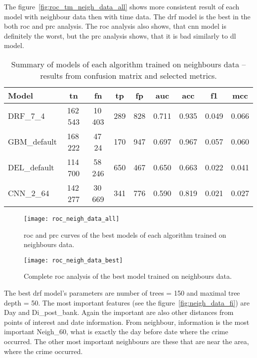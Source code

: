 \documentclass[thesis=M,english]{FITthesis}[2012/10/20]
\begin{document}
The figure~\ref{fig:roc_tm_neigh_data_all} shows more consistent result of each model with neighbour data then with time data. The \gls{drf} model is the best in the both \gls{roc} and \gls{prc} analysis. The \gls{roc} analysis also shows, that \gls{cnn} model is definitely the worst, but the \gls{prc} analysis shows, that it is bad similarly to \gls{dl} model. 

\begin{table}[H]\centering
\begin{small}
    \caption{Summary of models of each algorithm trained on neighbours data -- results from confusion matrix and selected metrics.}\label{tab:neigh_data_summary}
    \begin{tabular}{|l|c|c|c|c|c|c|c|c|}\hline
        Model & \gls{tn} & \gls{fn} & \gls{tp} & \gls{fp} & \gls{auc} & \gls{acc} & \gls{f1} & \gls{mcc} \tabularnewline \hline \hline
        DRF\_7\_4 & 162\,543 & 10\,403 & 289 & 828 & 0.711 & 0.935 & 0.049 & 0.066 \tabularnewline \hline
        GBM\_default & 168\,222 & 47\,24 & 170 & 947 & 0.697 & 0.967 & 0.057 & 0.060 \tabularnewline \hline
        DEL\_default & 114\,700 & 58\,246 & 650 & 467 & 0.650 & 0.663 & 0.022 & 0.041 \tabularnewline \hline
        CNN\_2\_64 & 142\,277 & 30\,669 & 341 & 776 & 0.590 & 0.819 & 0.021 & 0.027 \tabularnewline \hline
    \end{tabular}
\end{small}
\end{table}

\begin{figure}[ht]\centering
    \texttt{[image: roc\_neigh\_data\_all]}\label{fig:roc_neigh_data_all}
    \caption{\gls{roc} and \gls{prc} curves of the best models of each algorithm trained on neighbours data.}
\end{figure}

\begin{figure}[ht]\centering
    \texttt{[image: roc\_neigh\_data\_best]}\label{fig:roc_neigh_data_best}
    \caption{Complete \gls{roc} analysis of the best model trained on neighbours data.}
\end{figure}

The best \gls{drf} model's parameters are number of trees = 150 and maximal tree depth = 50. The most important features (see the figure~\ref{fig:neigh_data_fi}) are Day and Di\_post\_bank. Again the important are also other distances from points of interest and date information. From neighbour, information is the most important Neigh\_60, what is exactly the day before date where the crime occurred. The other most important neighbours are these that are near the area, where the crime occurred. 
\end{document}
